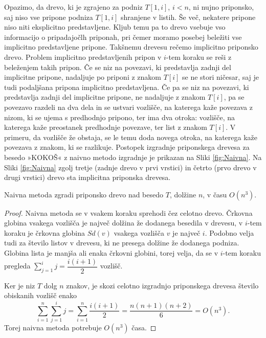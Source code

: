Opazimo, da drevo, ki  je zgrajeno za podniz $T[1,i]$, $i< n$, ni nujno priponsko, saj niso vse pripone podniza $T[1,i]$ shranjene v listih. Še več, nekatere pripone niso niti eksplicitno predstavljene. Kljub temu pa to drevo vsebuje vso informacijo o pripadajočlh priponah, pri čemer moramo posebej beležiti vse implicitno predstavljene pripone. Takšnemu drevesu rečemo implicitno priponsko drevo. Problem implicitno predstavljenih pripon v $i$-tem koraku se reši z beleženjem takih pripon. Če se niz na povezavi, ki predstavlja zadnji del implicitne pripone, nadaljuje po priponi z znakom $T[i]$ se ne stori ničesar, saj je tudi podaljšana pripona implicitno predstavljena. Če pa se niz na povezavi, ki predstavlja zadnji del implicitne pripone, ne nadaljuje z znakom $T[i]$, pa se povezavo razdeli na dva dela in se ustvari vozlišče, na katerega kaže povezava z nizom, ki se ujema s predhodnjo pripono, ter ima dva otroka: vozlišče, na katerega kaže preostanek predhodnje povezave, ter list z znakom $T[i]$. V primeru, da vozlišče že obstaja, se le temu doda novega otroka, na katerega kaže povezava z znakom, ki se razlikuje. Postopek izgradnje priponskega drevesa za besedo »KOKOŠ« z naivno metodo izgradnje je prikazan na Sliki \ref{fig:Naivna}. Na Sliki \ref{fig:Naivna} zgolj tretje (zadnje drevo v prvi vrstici) in četrto (prvo drevo v drugi vrstici) drevo sta implicitna priponska drevesa.

\begin{izr}\label{izr:naivna}
    Naivna metoda zgradi priponsko drevo nad besedo $T$, dolžine $n$, v času $O(n^3)$.
\end{izr}

\begin{proof}
    Naivna metoda se v vsakem koraku sprehodi čez celotno drevo. Črkovna globina vsakega vozlišča je največ dolžina že dodanega besedila v drevesu, v $i$-tem koraku je črkovna globina $\textit{Sd}(v)$ vsakega vozlišča $v$ je največ $i$. Podobno velja tudi za število listov v drevesu, ki ne presega dolžine že dodanega podniza. Globina lista je manjša ali enaka črkovni globini, torej velja, da se v $i$-tem koraku pregleda $\sum_{j=1}^i j=\dfrac{i(i+1)}{2}$ vozlišč.

    Ker je niz $T$ dolg $n$ znakov, je skozi celotno izgradnjo priponskega drevesa število obiskanih vozlišč enako
    $$
        \sum_{i=1}^n \sum_{j=1}^i j=\sum_{i=1}^n \dfrac{i(i+1)}{2}=\dfrac{n(n+1)(n+2)}{6}=O(n^3).
    $$
    Torej naivna metoda potrebuje $O(n^3)$ časa.
\end{proof}

